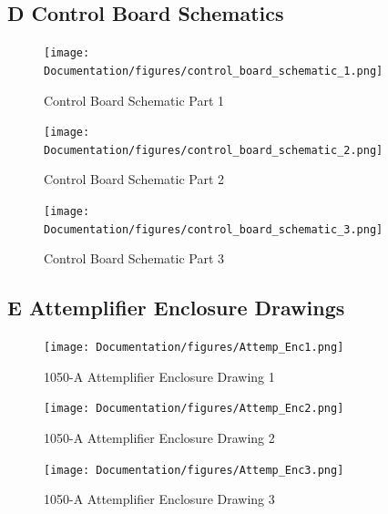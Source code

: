 \documentclass[12pt,a4paper,oneside]{article}
\begin{document}
\begin{landscape}
\newpage


\section*{D \hspace{.5cm} Control Board Schematics}


%
\begin{figure}[H]
\centering
\texttt{[image: Documentation/figures/control\_board\_schematic\_1.png]}
\caption{Control Board Schematic Part 1}
\label{fig:control_sch1}
\end{figure}
%

\end{landscape}

%
\begin{figure}[H]
\centering
\texttt{[image: Documentation/figures/control\_board\_schematic\_2.png]}
\caption{Control Board Schematic Part 2}
\label{fig:control_sch2}
\end{figure}
%

%
\begin{figure}[H]
\centering
\texttt{[image: Documentation/figures/control\_board\_schematic\_3.png]}
\caption{Control Board Schematic Part 3}
\label{fig:control_sch3}
\end{figure}
%

\begin{landscape}
\section*{E \hspace{.5cm} Attemplifier Enclosure Drawings}


 \begin{figure}[H]
 \centering
 \texttt{[image: Documentation/figures/Attemp\_Enc1.png]}
 \caption{1050-A Attemplifier Enclosure Drawing 1}
 \label{fig:Attemp_Enc1}
 \end{figure}
 
 \begin{figure}[H]
 \centering
 \texttt{[image: Documentation/figures/Attemp\_Enc2.png]}
 \caption{1050-A Attemplifier Enclosure Drawing 2}
 \label{fig:Attemp_Enc2}
 \end{figure}
 
 
 \begin{figure}[H]
 \centering
 \texttt{[image: Documentation/figures/Attemp\_Enc3.png]}
 \caption{1050-A Attemplifier Enclosure Drawing 3}
 \label{fig:Attemp_Enc3}
 \end{figure}

\end{landscape}
\end{document}
